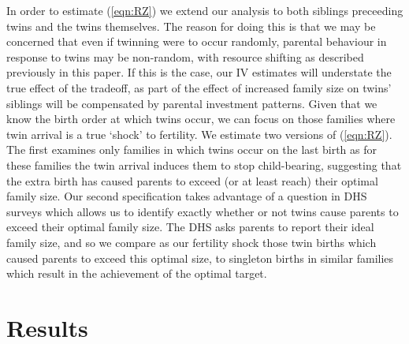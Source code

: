 \documentclass{article}[11pt,subeqn]
\begin{document}
\begin{spacing}{1.5}
In order to estimate (\ref{eqn:RZ}) we extend our analysis to both siblings preceeding twins and the twins themselves.  The reason for doing this is that we
may be concerned that even if twinning were to occur randomly, parental behaviour in response to twins may be non-random, with resource shifting as described previously
in this paper. If this is the case, our IV estimates will understate the true effect of the tradeoff, as part of the effect of increased family size on twins'
siblings will be compensated by parental investment patterns.  Given that we know the birth order at which twins occur, we can focus on those families where
twin arrival is a true `shock' to fertility.  We estimate two versions of (\ref{eqn:RZ}).  The first examines only families in which twins occur on the last 
birth as for these families the twin arrival induces them to stop child-bearing, suggesting that the extra birth has caused parents to exceed (or at least reach)
their optimal family size.  Our second specification takes advantage of a question in DHS surveys which allows us to identify exactly whether or not twins cause
parents to exceed their optimal family size.  The DHS asks parents to report their ideal family size, and so we compare as our fertility shock those twin births which 
caused parents to exceed this optimal size, to singleton births in similar families which result in the achievement of the optimal target.

\section{Results}
\label{scn:results}


\end{spacing}
\end{document}
